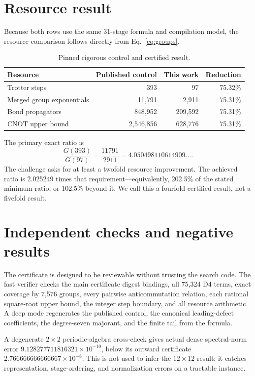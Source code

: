 \documentclass[11pt]{article}
\begin{document}
\section{Resource result}

Because both rows use the same 31-stage formula and compilation model, the
resource comparison follows directly from Eq.~\eqref{eq:groups}.

\begin{table}[ht]
\centering
\caption{Pinned rigorous control and certified result.}
\label{tab:resources}
\begin{tabular}{@{}lrrr@{}}
\toprule
Resource & Published control & This work & Reduction \\
\midrule
Trotter steps & 393 & 97 & 75.32\% \\
Merged group exponentials & 11,791 & 2,911 & 75.31\% \\
Bond propagators & 848,952 & 209,592 & 75.31\% \\
CNOT upper bound & 2,546,856 & 628,776 & 75.31\% \\
\bottomrule
\end{tabular}
\end{table}

The primary exact ratio is
\begin{equation}
  \frac{G(393)}{G(97)}=\frac{11791}{2911}
  =4.050498110614909\ldots.
\end{equation}
The challenge asks for at least a twofold resource improvement.  The achieved
ratio is 2.025249 times that requirement---equivalently, 202.5\% of the stated
minimum ratio, or 102.5\% beyond it.  We call this a fourfold certified result,
not a fivefold result.

\section{Independent checks and negative results}

The certificate is designed to be reviewable without trusting the search
code.  The fast verifier checks the main certificate digest bindings, all
75,324 D4 terms, exact coverage by 7,576 groups, every pairwise
anticommutation relation, each rational square-root upper bound, the integer
step boundary, and all resource arithmetic.  A deep mode regenerates the
published control, the canonical leading-defect coefficients, the
degree-seven majorant, and the finite tail from the formula.

A degenerate $2\times2$ periodic-algebra cross-check gives actual dense
spectral-norm error $9.128277711816321\times10^{-10}$, below its outward
certificate $2.766666666666667\times10^{-8}$.  This is not used to infer the
$12\times12$ result; it catches representation, stage-ordering, and
normalization errors on a tractable instance.
\end{document}
